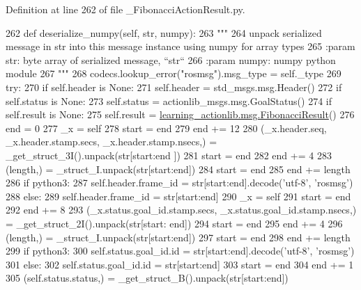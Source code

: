 Definition at line 262 of file \+\_\+\+Fibonacci\+Action\+Result.\+py.


\begin{DoxyCode}
262   \textcolor{keyword}{def }deserialize\_numpy(self, str, numpy):
263     \textcolor{stringliteral}{"""}
264 \textcolor{stringliteral}{    unpack serialized message in str into this message instance using numpy for array types}
265 \textcolor{stringliteral}{    :param str: byte array of serialized message, ``str``}
266 \textcolor{stringliteral}{    :param numpy: numpy python module}
267 \textcolor{stringliteral}{    """}
268     codecs.lookup\_error(\textcolor{stringliteral}{"rosmsg"}).msg\_type = self.\_type
269     \textcolor{keywordflow}{try}:
270       \textcolor{keywordflow}{if} self.header \textcolor{keywordflow}{is} \textcolor{keywordtype}{None}:
271         self.header = std\_msgs.msg.Header()
272       \textcolor{keywordflow}{if} self.status \textcolor{keywordflow}{is} \textcolor{keywordtype}{None}:
273         self.status = actionlib\_msgs.msg.GoalStatus()
274       \textcolor{keywordflow}{if} self.result \textcolor{keywordflow}{is} \textcolor{keywordtype}{None}:
275         self.result = \hyperlink{classlearning__actionlib_1_1msg_1_1__FibonacciResult_1_1FibonacciResult}{learning\_actionlib.msg.FibonacciResult}()
276       end = 0
277       \_x = self
278       start = end
279       end += 12
280       (\_x.header.seq, \_x.header.stamp.secs, \_x.header.stamp.nsecs,) = \_get\_struct\_3I().unpack(str[start:end
      ])
281       start = end
282       end += 4
283       (length,) = \_struct\_I.unpack(str[start:end])
284       start = end
285       end += length
286       \textcolor{keywordflow}{if} python3:
287         self.header.frame\_id = str[start:end].decode(\textcolor{stringliteral}{'utf-8'}, \textcolor{stringliteral}{'rosmsg'})
288       \textcolor{keywordflow}{else}:
289         self.header.frame\_id = str[start:end]
290       \_x = self
291       start = end
292       end += 8
293       (\_x.status.goal\_id.stamp.secs, \_x.status.goal\_id.stamp.nsecs,) = \_get\_struct\_2I().unpack(str[start:
      end])
294       start = end
295       end += 4
296       (length,) = \_struct\_I.unpack(str[start:end])
297       start = end
298       end += length
299       \textcolor{keywordflow}{if} python3:
300         self.status.goal\_id.id = str[start:end].decode(\textcolor{stringliteral}{'utf-8'}, \textcolor{stringliteral}{'rosmsg'})
301       \textcolor{keywordflow}{else}:
302         self.status.goal\_id.id = str[start:end]
303       start = end
304       end += 1
305       (self.status.status,) = \_get\_struct\_B().unpack(str[start:end])

\end{DoxyCode}

